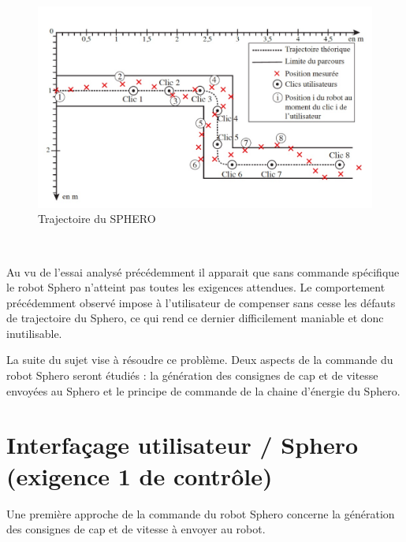 \begin{figure}[!ht]\begin{center}
 \includegraphics[width=\linewidth]{img/figure_5}
 \caption{Trajectoire du SPHERO}
 \label{fig5}
\end{center}\end{figure}



~\

Au vu de l'essai analysé précédemment il apparait que sans commande spécifique le robot Sphero n'atteint pas toutes les exigences attendues. Le comportement précédemment observé impose à l'utilisateur de compenser sans cesse les défauts de trajectoire du Sphero, ce qui rend ce dernier difficilement maniable et donc inutilisable. 

La suite du sujet vise à résoudre ce problème. Deux aspects de la commande du robot Sphero seront étudiés : la génération des consignes de cap et de vitesse envoyées au Sphero et le principe de commande de la chaine d'énergie du Sphero. 

\section{Interfaçage utilisateur / Sphero (exigence 1 de contrôle)}
Une première approche de la commande du robot Sphero concerne la génération des consignes de cap et de vitesse à envoyer au robot.

